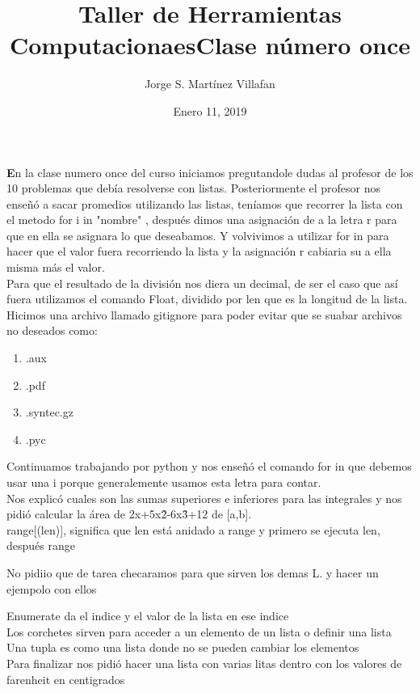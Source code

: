 \documentclass[letterpaper, 12pt, oneside]{article}%
\title{\Huge Taller de Herramientas Computacionaes}
\author{Jorge S. Martínez Villafan}
\date{Enero 11, 2019}
\begin{document}
\maketitle
\newpage
\title{Clase número once}

\textbf En la clase numero once del curso iniciamos pregutandole dudas al profesor de los 10 problemas que debía resolverse con listas.
Posteriormente el profesor nos enseñó a sacar promedios utilizando las listas, teníamos que recorrer la lista con el metodo 	\color{blue}for i in "nombre" \color{black}, después dimos una asignación de a la letra r para que en ella se asignara lo que deseabamos. Y volvivimos a utilizar \color{blue} for in \color{black} para hacer que el valor fuera recorriendo la lista y la asignación r cabiaria su a ella misma más el valor.\\
Para que el resultado de la división nos diera un decimal, de ser el caso que así fuera utilizamos el comando \color{blue} Float, \color{black} dividido por \color{blue} len \color{black} que es la longitud de la lista.\\

Hicimos una archivo llamado \color{blue} gitignore \color{black}para poder evitar que se suabar archivos no deseados como:
\begin{enumerate}
\item .aux 
\item .pdf 
\item.syntec.gz 
\item .pyc
\end{enumerate}
Continuamos trabajando por python y nos enseñó el comando \color{blue} for in \color{black} que debemos usar una i porque generalemente usamos esta letra para contar.\\

Nos explicó cuales son las sumas superiores e inferiores para las integrales y nos pidió calcular la área de 2x+5x\^2-6x\^3+12
de [a,b].\\

\color{blue}range[(len)]\color{black}, significa que len está anidado a range y primero se ejecuta len, después range

No pidiio que de tarea checaramos para que sirven los demas L. y hacer un ejempolo con ellos

\color{blue}Enumerate \color{black} da el indice y el valor de la lista en ese indice\\
Los corchetes sirven para acceder a un elemento de un lista o definir una lista\\
Una \color{red}tupla \color{black} es como una lista donde no se pueden cambiar los elementos \\
Para finalizar nos pidió hacer una lista con varias litas dentro con los valores de farenheit en centigrados\\

\end{document}
